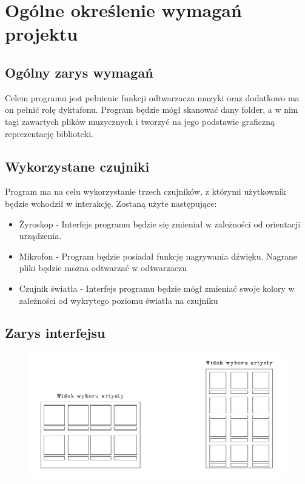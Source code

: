 	\newpage
\section{Ogólne określenie wymagań projektu}		%

\subsection{Ogólny zarys wymagań}

Celem programu jest pełnienie funkcji odtwarzacza muzyki oraz dodatkowo ma on pełnić rolę dyktafonu. Program będzie mógł skanować dany folder, a w nim tagi zawartych plików muzycznych i tworzyć na jego podstawie graficzną reprezentację biblioteki. 

\subsection{Wykorzystane czujniki}

Program ma na celu wykorzystanie trzech czujników, z którymi użytkownik będzie wchodził w interakcję. Zostaną użyte następujące:

\begin{itemize}
	\item Żyroskop - Interfejs programu będzie się zmieniał w zależności od orientacji urządzenia. 
	
	\item Mikrofon - Program będzie posiadał funkcję nagrywania dźwięku. Nagrane pliki będzie można odtwarzać w odtwarzaczu

	\item Czujnik światła - Interfejs programu będzie mógł zmieniać swoje kolory w zależności od wykrytego poziomu światła na czujniku
\end{itemize}

\subsection{Zarys interfejsu}

\begin{figure}[H]
	\centering
	\includegraphics[width=1\linewidth]{images/mockup2_artysta}
	\caption{}
	\label{fig:mockup2artysta}
\end{figure}


